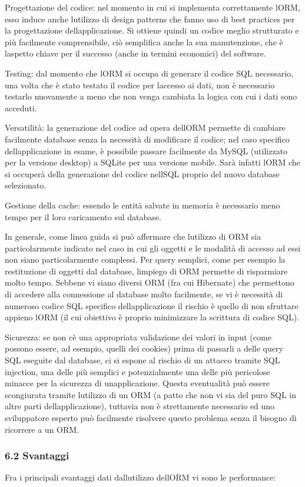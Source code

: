 \documentclass[
]{article}
\begin{document}
Progettazione del codice: nel momento in cui si implementa correttamente
l\textquotesingle ORM, esso induce anche l\textquotesingle utilizzo di
design patterns che fanno uso di best practices per la progettazione
dell\textquotesingle applicazione. Si ottiene quindi un codice meglio
strutturato e più facilmente comprensibile, ciò semplifica anche la sua
manutenzione, che è l\textquotesingle aspetto chiave per il successo
(anche in termini economici) del software.

Testing: dal momento che l\textquotesingle ORM si occupa di generare il
codice SQL necessario, una volta che è stato testato il codice per
l\textquotesingle accesso ai dati, non è necessario testarlo nuovamente
a meno che non venga cambiata la logica con cui i dati sono acceduti.

Versatilità: la generazione del codice ad opera dell\textquotesingle ORM
permette di cambiare facilmente database senza la necessità di
modificare il codice; nel caso specifico
dell\textquotesingle applicazione in esame, è possibile passare
facilmente da MySQL (utilizzato per la versione desktop) a SQLite per
una versione mobile. Sarà infatti l\textquotesingle ORM che si occuperà
della generazione del codice nell\textquotesingle SQL proprio del nuovo
database selezionato.

Gestione della cache: essendo le entità salvate in memoria è necessario
meno tempo per il loro caricamento sul database.

In generale, come linea guida si può affermare che
l\textquotesingle utilizzo di ORM sia particolarmente indicato nel caso
in cui gli oggetti e le modalità di accesso ad essi non siano
particolarmente complessi. Per query semplici, come per esempio la
restituzione di oggetti dal database, l\textquotesingle impiego di ORM
permette di risparmiare molto tempo. Sebbene vi siano diversi ORM (fra
cui Hibernate) che permettono di accedere alla connessione al database
molto facilmente, se vi è necessità di numeroso codice SQL specifico
dell\textquotesingle applicazione il rischio è quello di non sfruttare
appieno l\textquotesingle ORM (il cui obiettivo è proprio minimizzare la
scrittura di codice SQL).

Sicurezza: se non c\textquotesingle è una appropriata validazione dei
valori in input (come possono essere, ad esempio, quelli dei cookies)
prima di passarli a delle query SQL eseguite dal database, ci si espone
al rischio di un attacco tramite SQL injection, una delle più semplici e
potenzialmente una delle più pericolose minacce per la sicurezza di
un\textquotesingle applicazione. Questa eventualità può essere
scongiurata tramite l\textquotesingle utilizzo di un ORM (a patto che
non vi sia del puro SQL in altre parti
dell\textquotesingle applicazione), tuttavia non è strettamente
necessario ed uno sviluppatore esperto può facilmente risolvere questo
problema senza il bisogno di ricorrere a un ORM.

\subsubsection{6.2 Svantaggi}\label{svantaggi}

Fra i principali svantaggi dati dall\textquotesingle utilizzo
dell\textquotesingle ORM vi sono le performance:
\end{document}
